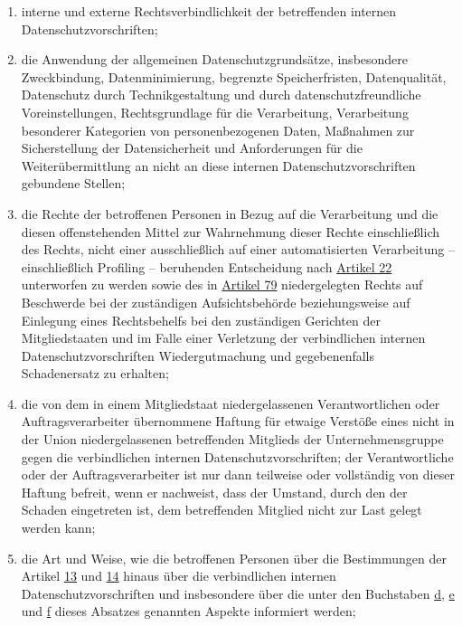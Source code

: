 \begin{enumerate}
\begin{enumerate}
    \item interne und externe Rechtsverbindlichkeit der betreffenden internen Datenschutzvorschriften;
    \label{itm:47-2c}

    \item die Anwendung der allgemeinen Datenschutzgrundsätze, insbesondere Zweckbindung, Datenminimierung, begrenzte
     Speicherfristen, Datenqualität, Datenschutz durch Technikgestaltung und durch datenschutzfreundliche
     Voreinstellungen, Rechtsgrundlage für die Verarbeitung, Verarbeitung besonderer Kategorien von personenbezogenen
     Daten, Maßnahmen zur Sicherstellung der Datensicherheit und Anforderungen für die Weiterübermittlung an nicht an
     diese internen Datenschutzvorschriften gebundene Stellen;
    \label{itm:47-2d}

    \item die Rechte der betroffenen Personen in Bezug auf die Verarbeitung und die diesen offenstehenden Mittel zur
     Wahrnehmung dieser Rechte einschließlich des Rechts, nicht einer ausschließlich auf einer automatisierten
     Verarbeitung -- einschließlich Profiling -- beruhenden Entscheidung nach \hyperref[ch:22]{Artikel 22} unterworfen
     zu werden sowie des in \hyperref[ch:79]{Artikel 79} niedergelegten Rechts auf Beschwerde bei der zuständigen
     Aufsichtsbehörde beziehungsweise auf Einlegung eines Rechtsbehelfs bei den zuständigen Gerichten der
     Mitgliedstaaten und im Falle einer Verletzung der verbindlichen internen Datenschutzvorschriften Wiedergutmachung
     und gegebenenfalls Schadenersatz zu erhalten;
    \label{itm:47-2e}

    \item die von dem in einem Mitgliedstaat niedergelassenen Verantwortlichen oder Auftragsverarbeiter übernommene
     Haftung für etwaige Verstöße eines nicht in der Union niedergelassenen betreffenden Mitglieds der
     Unternehmensgruppe gegen die verbindlichen internen Datenschutzvorschriften; der Verantwortliche oder der
     Auftragsverarbeiter ist nur dann teilweise oder vollständig von dieser Haftung befreit, wenn er nachweist, dass
     der Umstand, durch den der Schaden eingetreten ist, dem betreffenden Mitglied nicht zur Last gelegt werden kann;
    \label{itm:47-2f}

    \item die Art und Weise, wie die betroffenen Personen über die Bestimmungen der Artikel \hyperref[ch:13]{13} und
     \hyperref[ch:14]{14} hinaus über die verbindlichen internen Datenschutzvorschriften und insbesondere über die unter
     den Buchstaben \hyperref[itm:47-2d]{d}, \hyperref[itm:47-2e]{e} und \hyperref[itm:47-2f]{f} dieses Absatzes
     genannten Aspekte informiert werden;
    \label{itm:47-2g}


\end{enumerate}
\end{enumerate}
